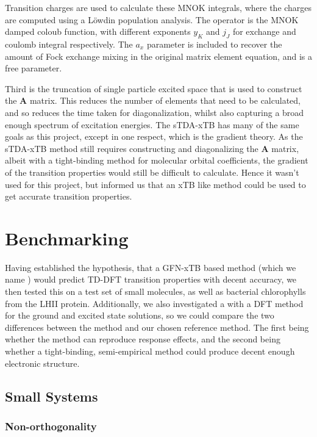 Transition charges are used to calculate these MNOK integrals, where the charges 
are computed using a Löwdin population analysis. The operator is the 
MNOK\cite{Nishimoto1957}\cite{Ohno1964}\cite{Klopman1964} damped coloub function, 
with different exponents $y_K$ and $j_J$ for exchange and coulomb integral respectively. 
The $a_x$ parameter is included to recover the amount of Fock exchange mixing in
the original matrix element equation, and is a free parameter.

Third is the truncation of single particle excited space that is used to construct 
the $\mathbf{A}$ matrix. This reduces the number of elements that need to be 
calculated, and so reduces the time taken for diagonalization, whilst also capturing 
a broad enough spectrum of excitation energies. The sTDA-xTB has many of the same 
goals as this project, except in one respect, which is the gradient theory. As 
the sTDA-xTB method still requires constructing and diagonalizing the $\mathbf{A}$ 
matrix, albeit with a tight-binding method for molecular orbital coefficients, 
the gradient of the transition properties would still be difficult to calculate. 
Hence it wasn't used for this project, but informed us that an xTB like method 
could be used to get accurate transition properties.

\section{Benchmarking}
\label{sec:benchmarking}
Having established the hypothesis, that a GFN-xTB based \dscf method (which we
name \dxtb) would predict TD-DFT transition properties with decent accuracy, we
then tested this on a test set of small molecules, as well as bacterial chlorophylls
from the LHII protein. Additionally, we also investigated a \dscf with a DFT method
for the ground and excited state solutions, so we could compare the two differences
between the \dxtb method and our chosen reference method. The first being whether
the \dscf method can reproduce response effects, and the second being whether a
tight-binding, semi-empirical method could produce decent enough electronic
structure.

\subsection{Small Systems}
\label{subsec:smalltest}

\subsubsection{Non-orthogonality}
\label{subsubsec:dscf_nonorth}

